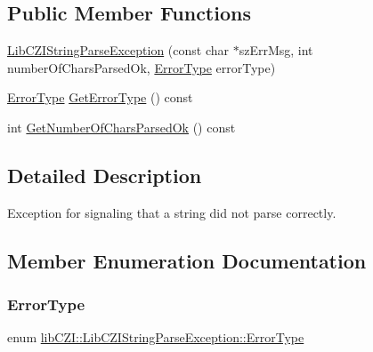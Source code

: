 \subsection*{Public Member Functions}
\begin{DoxyCompactItemize}
\item 
\hyperlink{classlib_c_z_i_1_1_lib_c_z_i_string_parse_exception_a6bcf9792770dc4cbe17f8a8a0d665b7d}{Lib\+C\+Z\+I\+String\+Parse\+Exception} (const char $\ast$sz\+Err\+Msg, int number\+Of\+Chars\+Parsed\+Ok, \hyperlink{classlib_c_z_i_1_1_lib_c_z_i_string_parse_exception_a42ecdd87f0e6f47ca0accda1b90497d2}{Error\+Type} error\+Type)
\item 
\hyperlink{classlib_c_z_i_1_1_lib_c_z_i_string_parse_exception_a42ecdd87f0e6f47ca0accda1b90497d2}{Error\+Type} \hyperlink{classlib_c_z_i_1_1_lib_c_z_i_string_parse_exception_abf18d7eb523f8aa3ed8b110e2cc170a2}{Get\+Error\+Type} () const
\item 
int \hyperlink{classlib_c_z_i_1_1_lib_c_z_i_string_parse_exception_ab9f93bffdad9f93cec7d69f66ce57dfc}{Get\+Number\+Of\+Chars\+Parsed\+Ok} () const
\end{DoxyCompactItemize}


\subsection{Detailed Description}
Exception for signaling that a string did not parse correctly. 

\subsection{Member Enumeration Documentation}
\mbox{\label{classlib_c_z_i_1_1_lib_c_z_i_string_parse_exception_a42ecdd87f0e6f47ca0accda1b90497d2}} 
\subsubsection{\texorpdfstring{Error\+Type}{ErrorType}}
{\footnotesize\ttfamily enum \hyperlink{classlib_c_z_i_1_1_lib_c_z_i_string_parse_exception_a42ecdd87f0e6f47ca0accda1b90497d2}{lib\+C\+Z\+I\+::\+Lib\+C\+Z\+I\+String\+Parse\+Exception\+::\+Error\+Type}\hspace{0.3cm}{\ttfamily [strong]}}



